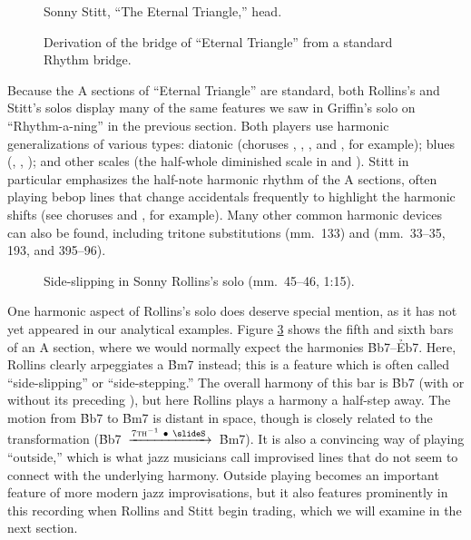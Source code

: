 \begin{figure}[tbp]
  \caption{Sonny Stitt, ``The Eternal Triangle,'' head.}
  \label{et:head-melody}
\end{figure}


\begin{figure}[tbp]
  \caption{Derivation of the bridge of ``Eternal Triangle'' from a standard
    Rhythm bridge.}
  \label{et:bridge-derivation}
\end{figure}

Because the A sections of ``Eternal Triangle'' are standard, both Rollins's
and Stitt's solos display many of the same features we saw in Griffin's solo
on ``Rhythm-a-ning'' in the previous section. Both players use harmonic
generalizations of various types: diatonic (choruses , ,
, and , for example); blues (, ,
); and other scales (the half-whole diminished scale in
 and ). Stitt in particular emphasizes the half-note
harmonic rhythm of the A sections, often playing bebop lines that change
accidentals frequently to highlight the harmonic shifts (see choruses
 and , for example). Many other common harmonic devices
can also be found, including tritone substitutions (mm.~133) and 
(mm.~33--35, 193, and 395--96).

\begin{figure}[tbp]
  \vspace{1em}
  \caption[Side-slipping in Sonny Rollins's solo.]{%
    Side-slipping in Sonny Rollins's solo (mm.~45--46, 1:15).}
  \label{et:sr-side-slipping}
\end{figure}

One harmonic aspect of Rollins's solo does deserve special mention, as it has
not yet appeared in our analytical examples. Figure \ref{et:sr-side-slipping}
shows the fifth and sixth bars of an A section, where we would normally expect
the harmonies \h{Bb7}--\h{Eb7}. Here, Rollins clearly arpeggiates a \h{Bm7}
instead; this is a feature which is often called ``side-slipping'' or
``side-stepping.'' The overall harmony of this bar is \h{Bb7} (with
or without its preceding \ii), but here Rollins plays a harmony a half-step
away. The motion from \h{Bb7} to \h{Bm7} is distant in \tf space, though is
closely related to the \slideS transformation \mbox{(\h{Bb7}
  $\xrightarrow{7\text{\textsc{th}}^{-1}\ \bullet\ \text{\slideS}\,}$
  \h{Bm7})}. It is also a convincing way of playing ``outside,''
which is what jazz musicians call improvised lines that do not seem to connect
with the underlying harmony. Outside playing becomes an important
feature of more modern jazz improvisations, but it also features prominently
in this recording when Rollins and Stitt begin trading, which we will examine
in the next section.

